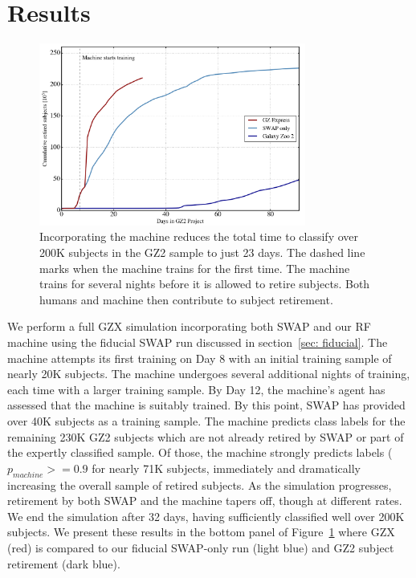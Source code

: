 \documentclass[twocolumn]{aastex6}
\begin{document}
\section{Results} \label{sec: results}

\begin{figure}[t!]
\raggedleft
\includegraphics[width=3.45in]{figures/GZ2_sup_PLPD5_p5_flipfeature2b_RF_accuracy_redo_raw_combo_moneyplot.png}
\caption{Incorporating the machine reduces the total time to classify over 200K subjects in the GZ2 sample to just 23 days. The dashed line marks when the machine trains for the first time.  The machine trains for several nights before it is allowed to retire subjects. Both humans and machine then contribute to subject retirement. \label{fig: money}}
\end{figure}

We perform a full GZX simulation incorporating both SWAP and our RF machine using the
 fiducial SWAP run discussed in section~\ref{sec: fiducial}. 
The machine attempts its first training on Day 8 with an initial training
sample of nearly 20K subjects.  The machine undergoes several additional nights of training, 
each time with a larger training sample. 
By Day 12, the machine's agent has assessed that the machine is suitably trained. 
By this point, SWAP has provided over 40K subjects as a training sample. 
The machine predicts class labels for the remaining 230K GZ2 subjects which are not 
already retired by SWAP or part of the expertly classified sample. 
Of those, the machine strongly predicts labels ($p_{machine} >= 0.9$ for nearly 71K subjects,  immediately and dramatically increasing the overall sample of retired subjects. 
As the simulation progresses, retirement by both SWAP and
the machine tapers off, though at different rates. 
We end the simulation after 32 days, having sufficiently classified well over 200K subjects. 
We present these results in the bottom panel of Figure~\ref{fig: money} where GZX (red) 
is compared to our fiducial SWAP-only run (light blue) and GZ2 subject retirement (dark blue). 
\end{document}
